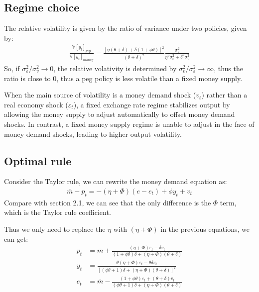 \documentclass[a4paper,12pt]{article} %
\theoremstyle{nonitalic}
\begin{document}
\subsection{Regime choice}

The relative volatility is given by the ratio of variance under two policies, given by:
\begin{gather*}
    \frac{\mathbb{V}[y_t]_{peg}}{\mathbb{V}[y_t]_{money}} = \frac{\left[ \eta (\theta + \delta) + \delta (1 + \phi \theta) \right]^2}{(\theta + \delta)^2} \frac{\sigma_{\varepsilon}^2}{\eta^2 \sigma_{\varepsilon}^2 + \delta^2 \sigma_v^2}
\end{gather*}
So, if $\sigma_{\varepsilon}^2 / \sigma_v^2 \to 0$, the relative volativity is determined by $\sigma_v^2 / \sigma_{\varepsilon}^2 \to  \infty $, thus the ratio is close to 0,
thus a peg policy is less volatile than a fixed money supply.

When the main source of volatility is a money demand shock ($v_t$) rather than a real economy shock ($\varepsilon_t$),
a fixed exchange rate regime stabilizes output by allowing the money supply to adjust automatically to offset money demand shocks.
In contrast, a fixed money supply regime is unable to adjust in the face of money demand shocks,
leading to higher output volatility.

\subsection{Optimal rule}

Consider the Taylor rule, we can rewrite the money demand equation as:
\begin{gather*}
    \overline{m} - p_t = -(\eta + \Phi) (e - e_t) + \phi y_t + v_t 
\end{gather*}
Compare with section 2.1, we can see that the only difference is the $\Phi$ term, which is the Taylor rule coefficient.

Thus we only need to replace the $\eta$ with $(\eta + \Phi)$ in the previous equations, we can get:
\begin{align*}
    p_t &= \overline{m} + \frac{(\eta + \Phi ) \varepsilon_t - \delta v_t}{(1 + \phi \theta)\delta + (\eta + \Phi) (\theta + \delta)} \\
    y_t &= \frac{\theta (\eta + \Phi) \varepsilon_t - \theta \delta v_t}{\left[ (\phi \theta + 1)\delta + (\eta + \Phi) (\theta + \delta) \right]^2} \\
    e_t &= \overline{m} - \frac{(1 + \phi \theta)\varepsilon_t + (\theta + \delta)v_t}{(\phi \theta + 1)\delta + (\eta + \Phi) (\theta + \delta)}
\end{align*}
\end{document}
